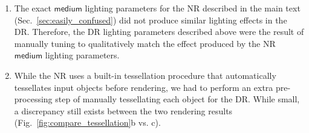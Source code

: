\documentclass[10pt,twocolumn,letterpaper]{article}
\newcommand{\medium}{\ensuremath{\mathsf{medium}}\xspace}
\begin{document}
\begin{enumerate}
	\item The exact \medium lighting parameters for the NR described in the main text (Sec.~\ref{sec:easily_confused}) did not produce similar lighting effects in the DR.
	Therefore, the DR lighting parameters described above were the result of manually tuning to qualitatively match the effect produced by the NR \medium lighting parameters.
	\item While the NR uses a built-in tessellation procedure that automatically tessellates input objects before rendering, we had to perform an extra pre-processing step of manually tessellating each object for the DR.
	While small, a discrepancy still exists between the two rendering results (Fig.~\ref{fig:compare_tessellation}b vs. c).
\end{enumerate}



\end{document}
